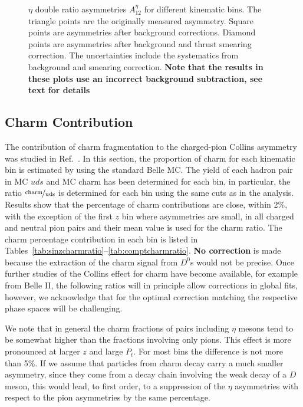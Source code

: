 \begin{figure}[h]
  \caption[$\eta$ double ratio asymmetries $A^{\eta}_{12}$ after background and thrust-smearing corrections for different kinematic bins]{$\eta$ double ratio asymmetries $A^{\eta}_{12}$ for different kinematic bins. The triangle points are the originally measured asymmetry. Square points are asymmetries after background corrections. Diamond points are asymmetries after background and thrust smearing correction. The uncertainties include the systematics from background and smearing correction. {\bf Note that the results in these plots use an incorrect background subtraction, see text for details}}
  \label{fig:etaresult}
\end{figure}


\subsection{Charm Contribution}
\label{sec:charmcontribution}
The contribution of charm fragmentation to the charged-pion Collins asymmetry was studied in Ref.~\cite{ChargedPionResult2}. 
In this section, the proportion of charm for each kinematic bin is estimated by using the standard Belle MC. The yield of each hadron pair in MC \(uds\) and MC charm has been determined for each bin, in particular, the ratio $\nicefrac{\mathrm{charm}}{\mathrm{uds}}$ is determined for each bin using the same cuts as in the analysis. Results show that the percentage of charm contributions are close, within 2\%, with the exception of the first $z$ bin where asymmetries are small, in all charged and neutral pion pairs and their mean value is used for the charm ratio. The charm percentage contribution in each bin is listed in Tables~\ref{tab:sinzcharmratio}--\ref{tab:comptcharmratio}. {\bf No correction} is made because the extraction of the charm signal from $D^0$s would not be precise. Once further studies of the Collins effect for charm have become available, for example from Belle II, the following ratios will in principle allow corrections in global fits, however, we acknowledge that for the optimal correction matching the respective phase spaces will be challenging.

We note that in general the charm fractions of pairs including $\eta$ mesons tend to be somewhat higher than the fractions involving only pions. This effect is more pronounced at larger $z$ and large $P_t$. For most bins the difference is not more than 5\%. If we assume that particles from charm decay carry a much smaller asymmetry, since they come from a decay chain involving the weak decay of a $D$ meson, this would lead, to first order, to a suppression of the $\eta$ asymmetries with respect to the pion asymmetries by the same percentage.


